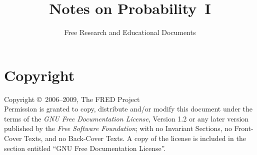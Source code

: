 \documentclass[12pt,openany]{book}
\begin{document}
\author{Free Research and Educational Documents}
\title{Notes on Probability~I}

\maketitle

\frontmatter

\chapter*{Copyright}
Copyright \copyright\ 2006--2009,
The FRED Project \\

Permission is granted to copy, distribute and/or modify this document under the terms of the \emph{GNU Free Documentation License}, Version 1.2 or any later version published by the \emph{Free Software Foundation}; with no Invariant Sections, no Front-Cover Texts, and no Back-Cover Texts.
A copy of the license is included in the section entitled ``GNU Free Documentation License''.


\mainmatter

%







%
%
%


%
%
%

%

%

%

\printindex
\end{document}
